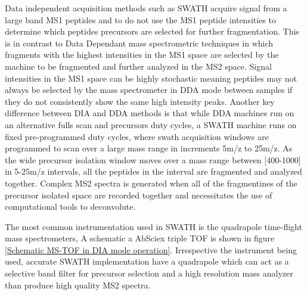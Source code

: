 \documentclass[a4paper,11pt,twoside]{book}
\begin{document}
	
	Data independent acquisition methods such as SWATH\citep{Gillet2012TargetedAnalysis} acquire signal from a large band MS1 peptides and to do not use the MS1 peptide intensities to determine which peptides precursors are selected for further fragmentation\citep{Venable2004AutomatedSpectra}. This is in contrast to Data Dependant mass spectrometric techniques in which fragments with the highest intensities in the MS1 space are selected by the machine to be fragmented and further analyzed in the MS2 space. Signal intensities in the MS1 space can be highly stochastic meaning peptides may not always be selected by the mass spectrometer in DDA mode between samples if they do not consistently show the same high intensity peaks. Another key difference between DIA and DDA methods is that while DDA machines run on an alternative fulls scan and precursors duty cycles, a SWATH machine runs on fixed pre-programmed duty cycles, where swath acquisition windows are programmed to scan over a large mass range in increments 5m/z to 25m/z\citep{Rost2017AutomatedChromatograms}. As the wide precursor isolation window moves over a mass range between [400-1000] in 5-25m/z intervals, all the peptides in the interval are fragmented and analyzed together. Complex MS2 spectra is generated when all of the fragmentines of the precursor isolated space are recorded together and necessitates the use of computational tools to deconvolute. 
	
	The most common instrumentation used in SWATH is the quadrapole time-flight mass spectrometers, A schematic a AbSciex triple TOF is shown in figure \ref{Schematic MS-TOF in DIA mode operation}. Irrespective the instrument being used, accurate SWATH implementation have a quadrapole which can act as a selective band filter for precursor selection and a high resolution mass analyzer than produce high quality MS2 spectra.
		
\end{document}
